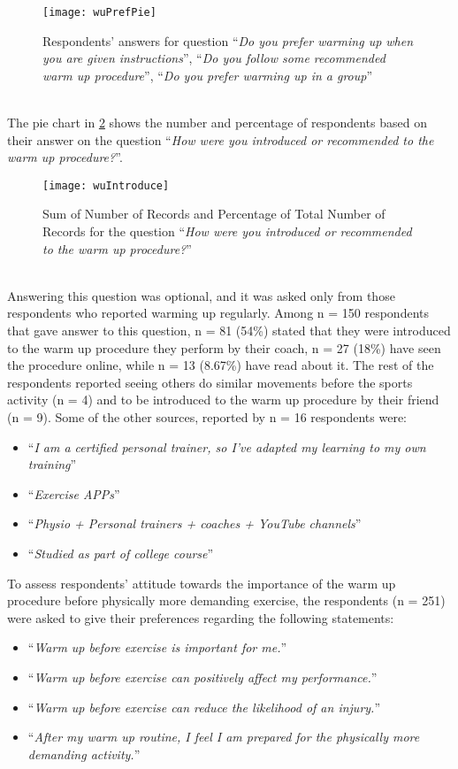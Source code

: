 \begin{figure}[h]
    \centering
    \texttt{[image: wuPrefPie]}
    \caption{Respondents' answers for question ``\textit{Do you prefer warming up when you are given instructions}'', ``\textit{Do you follow some recommended warm up procedure}'', ``\textit{Do you prefer warming up in a group}''}
    \label{fig:wuPrefPie}
\end{figure}\\
The pie chart in \ref{fig:wuIntroduce} shows the number and percentage of respondents based on their answer on the question ``\textit{How were you introduced or recommended to the warm up procedure?}''.
\begin{figure}[h]
    \centering
    \texttt{[image: wuIntroduce]}
    \caption{Sum of Number of Records and Percentage of Total Number of Records for the question ``\textit{How were you introduced or recommended to the warm up procedure?}''}
    \label{fig:wuIntroduce}
\end{figure}\\
Answering this question was optional, and it was asked only from those respondents who reported warming up regularly. Among n = 150 respondents that gave answer to this question, n = 81 (54\%) stated that they were introduced to the warm up procedure they perform by their coach, n = 27 (18\%) have seen the procedure online, while n = 13 (8.67\%) have read about it. The rest of the respondents reported seeing others do similar movements before the sports activity (n = 4) and to be introduced to the warm up procedure by their friend (n = 9). Some of the other sources, reported by n = 16 respondents were:
\begin{itemize}
\item ``\textit{I am a certified personal trainer, so I've adapted my learning to my own training}''
\item  ``\textit{Exercise APPs}''
\item  ``\textit{Physio + Personal trainers + coaches + YouTube channels}''
\item  ``\textit{Studied as part of college course}''
\end{itemize}
To assess respondents' attitude towards the importance of the warm up procedure before physically more demanding exercise, the respondents (n = 251) were asked to give their preferences regarding the following statements: 
\begin{itemize}
\item ``\textit{Warm up before exercise is important for me.}''
\item  ``\textit{Warm up before exercise can positively affect my performance.}''
\item  ``\textit{Warm up before exercise can reduce the likelihood of an injury.}''
\item  ``\textit{After my warm up routine, I feel I am prepared for the physically more demanding activity.}''
\end{itemize}
